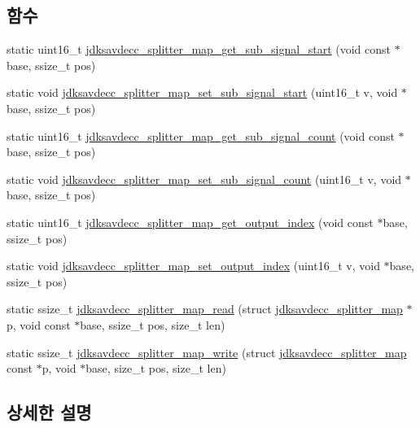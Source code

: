 \subsection*{함수}
\begin{DoxyCompactItemize}
\item 
static uint16\+\_\+t \hyperlink{group__splitter__map_ga730445c5d591ae15da12cd20353de5a4}{jdksavdecc\+\_\+splitter\+\_\+map\+\_\+get\+\_\+sub\+\_\+signal\+\_\+start} (void const $\ast$base, ssize\+\_\+t pos)
\item 
static void \hyperlink{group__splitter__map_gaafae34bc46bedd9ce56cdaf4b921348d}{jdksavdecc\+\_\+splitter\+\_\+map\+\_\+set\+\_\+sub\+\_\+signal\+\_\+start} (uint16\+\_\+t v, void $\ast$base, ssize\+\_\+t pos)
\item 
static uint16\+\_\+t \hyperlink{group__splitter__map_ga1e6952afca660ea9c790c178afba61c1}{jdksavdecc\+\_\+splitter\+\_\+map\+\_\+get\+\_\+sub\+\_\+signal\+\_\+count} (void const $\ast$base, ssize\+\_\+t pos)
\item 
static void \hyperlink{group__splitter__map_gafd76e7ec45953bc06ca64e8b2310529a}{jdksavdecc\+\_\+splitter\+\_\+map\+\_\+set\+\_\+sub\+\_\+signal\+\_\+count} (uint16\+\_\+t v, void $\ast$base, ssize\+\_\+t pos)
\item 
static uint16\+\_\+t \hyperlink{group__splitter__map_ga18ec23b2d17f762844bf81166d311c31}{jdksavdecc\+\_\+splitter\+\_\+map\+\_\+get\+\_\+output\+\_\+index} (void const $\ast$base, ssize\+\_\+t pos)
\item 
static void \hyperlink{group__splitter__map_ga0af5f0ca334dd58d83f96a88c1699c13}{jdksavdecc\+\_\+splitter\+\_\+map\+\_\+set\+\_\+output\+\_\+index} (uint16\+\_\+t v, void $\ast$base, ssize\+\_\+t pos)
\item 
static ssize\+\_\+t \hyperlink{group__splitter__map_ga21692f4eb56fd285e11293abaa66873b}{jdksavdecc\+\_\+splitter\+\_\+map\+\_\+read} (struct \hyperlink{structjdksavdecc__splitter__map}{jdksavdecc\+\_\+splitter\+\_\+map} $\ast$p, void const $\ast$base, ssize\+\_\+t pos, size\+\_\+t len)
\item 
static ssize\+\_\+t \hyperlink{group__splitter__map_gab3285fa48b1f5a5393f15bb374b94ec3}{jdksavdecc\+\_\+splitter\+\_\+map\+\_\+write} (struct \hyperlink{structjdksavdecc__splitter__map}{jdksavdecc\+\_\+splitter\+\_\+map} const $\ast$p, void $\ast$base, size\+\_\+t pos, size\+\_\+t len)
\end{DoxyCompactItemize}


\subsection{상세한 설명}


